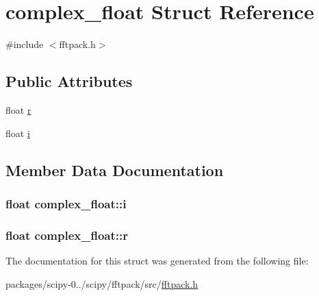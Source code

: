 \hypertarget{structcomplex__float}{}\section{complex\+\_\+float Struct Reference}
\label{structcomplex__float}


{\ttfamily \#include $<$fftpack.\+h$>$}

\subsection*{Public Attributes}
\begin{DoxyCompactItemize}
\item 
float \hyperlink{structcomplex__float_aaf7cbb46e02419f7685316a310260e9e}{r}
\item 
float \hyperlink{structcomplex__float_acd48c2869ff7b3672be93b019fcbf5b6}{i}
\end{DoxyCompactItemize}


\subsection{Member Data Documentation}
\hypertarget{structcomplex__float_acd48c2869ff7b3672be93b019fcbf5b6}{}
\subsubsection[{i}]{\setlength{\rightskip}{0pt plus 5cm}float complex\+\_\+float\+::i}\label{structcomplex__float_acd48c2869ff7b3672be93b019fcbf5b6}
\hypertarget{structcomplex__float_aaf7cbb46e02419f7685316a310260e9e}{}
\subsubsection[{r}]{\setlength{\rightskip}{0pt plus 5cm}float complex\+\_\+float\+::r}\label{structcomplex__float_aaf7cbb46e02419f7685316a310260e9e}


The documentation for this struct was generated from the following file\+:\begin{DoxyCompactItemize}
\item 
packages/scipy-\/0../scipy/fftpack/src/\hyperlink{fftpack_8h}{fftpack.\+h}\end{DoxyCompactItemize}
